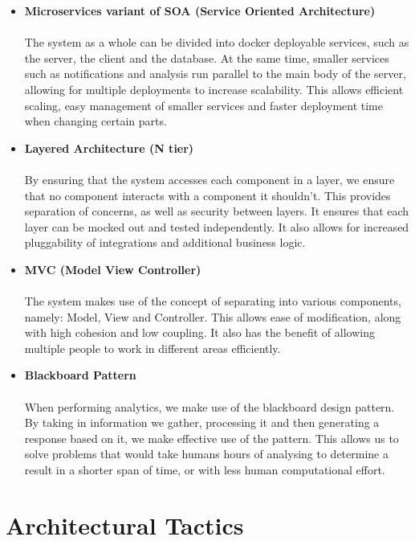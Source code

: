 \documentclass[12pt]{article}
\begin{document}
\begin{itemize}
	
	\item \textbf{Microservices variant of SOA (Service Oriented Architecture)}\\\\
	The system as a whole can be divided into docker deployable services, such as the server, the client and the database. At the same time, smaller services such as notifications and analysis run parallel to the main body of the server, allowing for multiple deployments to increase scalability. This allows efficient scaling, easy management of smaller services and faster deployment time when changing certain parts.
	
	\item \textbf{Layered Architecture (N tier)}\\\\
	By ensuring that the system accesses each component in a layer, we ensure that no component interacts with a component it shouldn't. This provides separation of concerns, as well as security between layers. It ensures that each layer can be mocked out and tested independently. It also allows for increased pluggability of integrations and additional business logic.
	
	\item \textbf{MVC (Model View Controller)}\\\\
	The system makes use of the concept of separating into various components, namely: Model, View and Controller. This allows ease of modification, along with high cohesion and low coupling. It also has the benefit of allowing multiple people to work in different areas efficiently.
	
	\item \textbf{Blackboard Pattern}\\\\
	When performing analytics, we make use of the blackboard design pattern. By taking in information we gather, processing it and then generating a response based on it, we make effective use of the pattern. This allows us to solve problems that would take humans hours of analysing to determine a result in a shorter span of time, or with less human computational effort.

\end{itemize}

\pagebreak

\section{Architectural Tactics}
\end{document}

